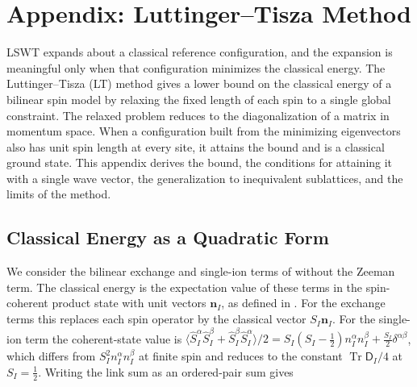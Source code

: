 
\hypertarget{sec-lswt-luttinger-tisza-method}{%
\section{Appendix: Luttinger--Tisza Method}\label{sec-lswt-luttinger-tisza-method}}

LSWT expands about a classical reference configuration, and the expansion is meaningful only when that configuration minimizes the classical energy. The Luttinger--Tisza (LT) method gives a lower bound on the classical energy of a bilinear spin model by relaxing the fixed length of each spin to a single global constraint. The relaxed problem reduces to the diagonalization of a matrix in momentum space. When a configuration built from the minimizing eigenvectors also has unit spin length at every site, it attains the bound and is a classical ground state. This appendix derives the bound, the conditions for attaining it with a single wave vector, the generalization to inequivalent sublattices, and the limits of the method.

\subsection{Classical Energy as a Quadratic Form}

We consider the bilinear exchange and single-ion terms of  without the Zeeman term. The classical energy is the expectation value of these terms in the spin-coherent product state with unit vectors \(\mathbf n_I\), as defined in . For the exchange terms this replaces each spin operator by the classical vector \(S_I\mathbf n_I\). For the single-ion term the coherent-state value is \(\langle\hat S_I^\alpha\hat S_I^\beta+\hat S_I^\beta\hat S_I^\alpha\rangle/2=S_I(S_I-\tfrac12)n_I^\alpha n_I^\beta+\tfrac{S_I}2\delta^{\alpha\beta}\), which differs from \(S_I^2n_I^\alpha n_I^\beta\) at finite spin and reduces to the constant \(\operatorname{Tr}\mathsf D_I/4\) at \(S_I=\tfrac12\). Writing the link sum as an ordered-pair sum gives

